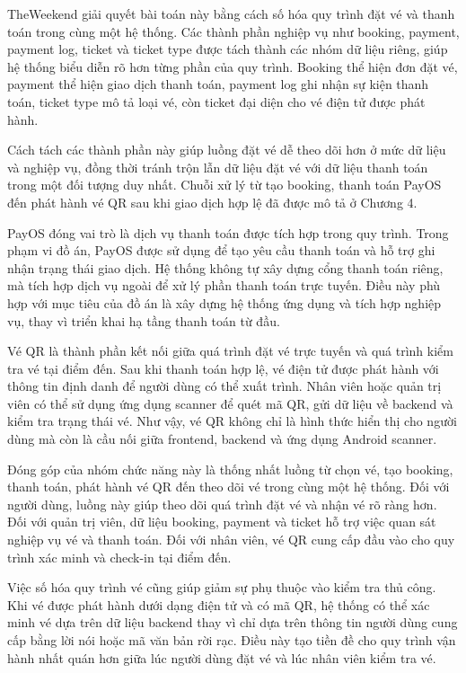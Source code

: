 \documentclass[../DoAn.tex]{subfiles}
\begin{document}
TheWeekend giải quyết bài toán này bằng cách số hóa quy trình đặt vé và thanh toán trong cùng một hệ thống. Các thành phần nghiệp vụ như booking, payment, payment log, ticket và ticket type được tách thành các nhóm dữ liệu riêng, giúp hệ thống biểu diễn rõ hơn từng phần của quy trình. Booking thể hiện đơn đặt vé, payment thể hiện giao dịch thanh toán, payment log ghi nhận sự kiện thanh toán, ticket type mô tả loại vé, còn ticket đại diện cho vé điện tử được phát hành.

Cách tách các thành phần này giúp luồng đặt vé dễ theo dõi hơn ở mức dữ liệu và nghiệp vụ, đồng thời tránh trộn lẫn dữ liệu đặt vé với dữ liệu thanh toán trong một đối tượng duy nhất. Chuỗi xử lý từ tạo booking, thanh toán PayOS đến phát hành vé QR sau khi giao dịch hợp lệ đã được mô tả ở Chương 4.

PayOS đóng vai trò là dịch vụ thanh toán được tích hợp trong quy trình. Trong phạm vi đồ án, PayOS được sử dụng để tạo yêu cầu thanh toán và hỗ trợ ghi nhận trạng thái giao dịch. Hệ thống không tự xây dựng cổng thanh toán riêng, mà tích hợp dịch vụ ngoài để xử lý phần thanh toán trực tuyến. Điều này phù hợp với mục tiêu của đồ án là xây dựng hệ thống ứng dụng và tích hợp nghiệp vụ, thay vì triển khai hạ tầng thanh toán từ đầu.

Vé QR là thành phần kết nối giữa quá trình đặt vé trực tuyến và quá trình kiểm tra vé tại điểm đến. Sau khi thanh toán hợp lệ, vé điện tử được phát hành với thông tin định danh để người dùng có thể xuất trình. Nhân viên hoặc quản trị viên có thể sử dụng ứng dụng scanner để quét mã QR, gửi dữ liệu về backend và kiểm tra trạng thái vé. Như vậy, vé QR không chỉ là hình thức hiển thị cho người dùng mà còn là cầu nối giữa frontend, backend và ứng dụng Android scanner.

Đóng góp của nhóm chức năng này là thống nhất luồng từ chọn vé, tạo booking, thanh toán, phát hành vé QR đến theo dõi vé trong cùng một hệ thống. Đối với người dùng, luồng này giúp theo dõi quá trình đặt vé và nhận vé rõ ràng hơn. Đối với quản trị viên, dữ liệu booking, payment và ticket hỗ trợ việc quan sát nghiệp vụ vé và thanh toán. Đối với nhân viên, vé QR cung cấp đầu vào cho quy trình xác minh và check-in tại điểm đến.

Việc số hóa quy trình vé cũng giúp giảm sự phụ thuộc vào kiểm tra thủ công. Khi vé được phát hành dưới dạng điện tử và có mã QR, hệ thống có thể xác minh vé dựa trên dữ liệu backend thay vì chỉ dựa trên thông tin người dùng cung cấp bằng lời nói hoặc mã văn bản rời rạc. Điều này tạo tiền đề cho quy trình vận hành nhất quán hơn giữa lúc người dùng đặt vé và lúc nhân viên kiểm tra vé.
\end{document}
